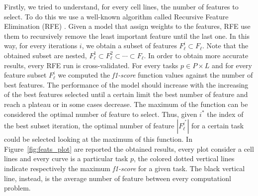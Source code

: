 Firstly, we tried to understand, for every cell lines, the number of features to select. To do this we use a well-known algorithm called Recursive Feature Elimination (RFE) \cite{VapnikRFE}. Given a model that assign weights to the features, RFE use them to recursively remove the least important feature until the last one. In this way, for every iterations $i$, we obtain a subset of features $F_{\ell}^{i} \subset F_\ell$. Note that the obtained subset are nested, $F_{\ell}^{1}  \subset  F_{\ell}^{2} \subset \cdots \subset F_{\ell}$. In order to obtain more accurate results, every RFE run is cross-validated. For every tasks $p \in P \times L$ and for every feature subset $F_\ell^i$ we computed the \emph{f1-score} function values against the number of best features. The performance of the model should increase with the increasing of the best features selected until a certain limit the best number of feature and reach a plateau or in some cases decrease. The maximum of the function can be considered the optimal number of feature to select. Thus, given $i^{*}$ the index of the best subset iteration, the optimal number of feature $|F_\ell^{i^{*}}|$ for a certain task could be selected looking at the maximum of this function. In Figure~\ref{fig:feats_plot} are reported the obtained results, every plot consider a cell lines and every curve is a particular task $p$, the colored dotted vertical lines indicate respectively the maximum \emph{f1-score} for a given task. The black vertical line, instead, is the average number of feature between every computationl problem. 

